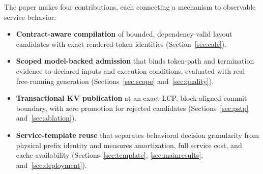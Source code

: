 The paper makes four contributions, each connecting a mechanism to observable service behavior:
\begin{itemize}
\item \textbf{Contract-aware compilation} of bounded, dependency-valid layout candidates with exact rendered-token identities (Section~\ref{sec:calc}).
\item \textbf{Scoped model-backed admission} that binds token-path and termination evidence to declared inputs and execution conditions, evaluated with real free-running generation (Sections~\ref{sec:scope} and~\ref{sec:quality}).
\item \textbf{Transactional KV publication} at an exact-LCP, block-aligned commit boundary, with zero promotion for rejected candidates (Sections~\ref{sec:pstp} and~\ref{sec:ablation}).
\item \textbf{Service-template reuse} that separates behavioral decision granularity from physical prefix identity and measures amortization, full service cost, and cache availability (Sections~\ref{sec:template}, \ref{sec:mainresults}, and~\ref{sec:deployment}).
\end{itemize}

